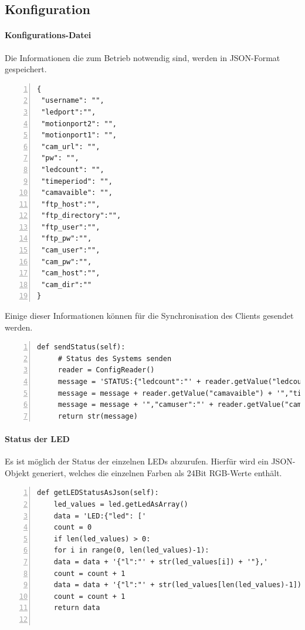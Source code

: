 \subsection{Konfiguration}
\paragraph{Konfigurations-Datei}
Die Informationen die zum Betrieb notwendig sind, werden in JSON-Format gespeichert.
\begin{lstlisting}[caption=Konfigurationsdatei config.json, language=xml, frame=single, breaklines=true,columns=fullflexible, commentstyle=\color{gray}\upshape, captionpos=b, numbers = left]
{
 "username": "",
 "ledport":"", 
 "motionport2": "", 
 "motionport1": "", 
 "cam_url": "", 
 "pw": "", 
 "ledcount": "", 
 "timeperiod": "", 
 "camavaible": "", 
 "ftp_host":"", 
 "ftp_directory":"", 
 "ftp_user":"", 
 "ftp_pw":"", 
 "cam_user":"", 
 "cam_pw":"", 
 "cam_host":"",
 "cam_dir":""
}
\end{lstlisting}
Einige dieser Informationen können für die Synchronisation des Clients gesendet werden.
\begin{lstlisting}[caption=Senden von Konfigurationsinformationen an den Client, language=xml, frame=single, breaklines=true,columns=fullflexible, commentstyle=\color{gray}\upshape, captionpos=b, numbers = left]
def sendStatus(self):
	 # Status des Systems senden
	 reader = ConfigReader()
	 message = 'STATUS:{"ledcount":"' + reader.getValue("ledcount") + '","motionport1":"' + reader.getValue("motionport1") + '","motionport2":"' + reader.getValue("motionport2") + '","camavaible":"'
	 message = message + reader.getValue("camavaible") + '","timeperiod":"' + reader.getValue("timeperiod") + '","ftpdir":"' + reader.getValue("ftp_directory") + '","ftphost":"' + reader.getValue("ftp_host")
	 message = message + '","camuser":"' + reader.getValue("cam_user") + '","ftpuser":"' + reader.getValue("ftp_user") + '","ftppw":"' + reader.getValue("ftp_pw") + '","camhost":"' + reader.getValue("cam_host") + '"}'
	 return str(message)
\end{lstlisting}

\paragraph{Status der LED} Es ist möglich der Status der einzelnen LEDs abzurufen. Hierfür wird ein JSON-Objekt generiert, welches die einzelnen Farben als 24Bit RGB-Werte enthält.
\begin{lstlisting}[caption=Status der LEDs an Client senden, language=xml, frame=single, breaklines=true,columns=fullflexible, commentstyle=\color{gray}\upshape, captionpos=b, numbers = left]
def getLEDStatusAsJson(self):
	led_values = led.getLedAsArray()
	data = 'LED:{"led": ['
	count = 0
	if len(led_values) > 0:
	for i in range(0, len(led_values)-1):
	data = data + '{"l":"' + str(led_values[i]) + '"},'
	count = count + 1
	data = data + '{"l":"' + str(led_values[len(led_values)-1]) + '"}]}'
	count = count + 1
	return data
  
\end{lstlisting}

